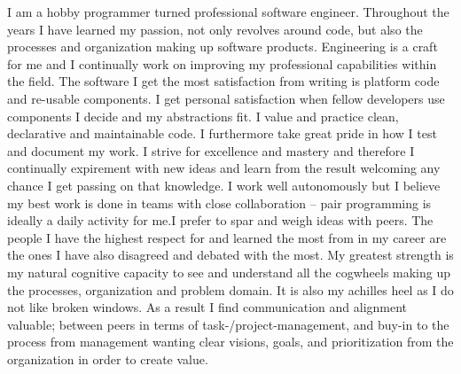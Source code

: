 
I am a hobby programmer turned professional software engineer. Throughout the years I have learned my passion, not only revolves around code, but also the processes and organization making up software products.
\newline\newline
Engineering is a craft for me and I continually work on improving my professional capabilities within the field.
\newline\newline
The software I get the most satisfaction from writing is platform code and re-usable components. I get personal satisfaction when fellow developers use components I decide and my abstractions fit.
\newline\newline
I value and practice clean, declarative and maintainable code. I furthermore take great pride in how I test and document my work. I strive for excellence and mastery and therefore I continually expirement with new ideas and learn from the result welcoming any chance I get passing on that knowledge.
\newline\newline
I work well autonomously but I believe my best work is done in teams with close collaboration -- pair programming is ideally a daily activity for me.I prefer to spar and weigh ideas with peers. The people I have the highest respect for and learned the most from in my career are the ones I have also disagreed and debated with the most.
\newline\newline
My greatest strength is my natural cognitive capacity to see and understand all the cogwheels making up the processes, organization and problem domain. It is also my achilles heel as I do not like broken windows.
\newline\newline
As a result I find communication and alignment valuable; between peers in terms of task-/project-management,  and buy-in to the process from management wanting clear visions, goals, and prioritization from the organization in order to create value.
